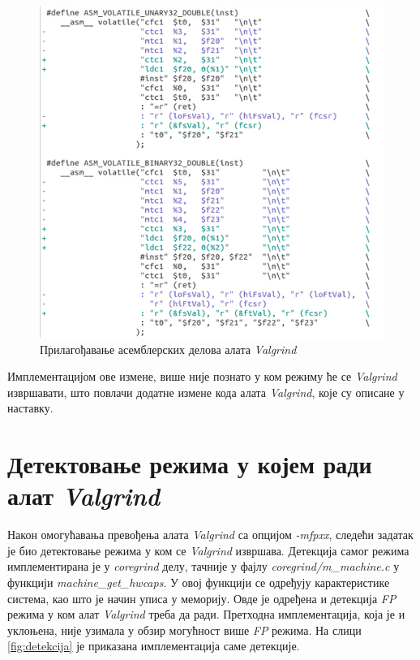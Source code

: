 \documentclass[12pt,oneside]{memoir}
\begin{document}
\begin{figure}[h!]
\begin{center}
\includegraphics[scale=0.75]{slika26.png}
\end{center}
\caption{Прилагођавање асемблерских делова алата \textit{Valgrind}}
\label{fig:asm}
\end{figure}

\indent Имплементацијом ове измене, више није познато у ком режиму ће се \textit{Valgrind} извршавати, што повлачи додатне измене кода алата \textit{Valgrind}, које су описане у наставку.

\section{Детектовање режима у којем ради алат \textit{Valgrind}}

\indent Након омогућавања превођења алата \textit{Valgrind} са опцијом \textit{-mfpxx}, следећи задатак је био детектовање режима у ком се \textit{Valgrind} извршава. Детекција самог режима имплементирана је у \textit{coregrind} делу, тачније у фајлу \textit{coregrind/m\_mach\-ine.c} у функцији \textit{machine\_get\_hwcaps}. У овој функцији се одређују карактеристике система, као што је начин уписа у меморију. Овде је одређена и детекција \textit{FP} режима у ком алат \textit{Valgrind} треба да ради. Претходна имплементација, која је и уклоњена, није узимала у обзир могућност више \textit{FP} режима.
 На слици \ref{fig:detekcija} је приказана имплементација саме детекције.
\end{document}
